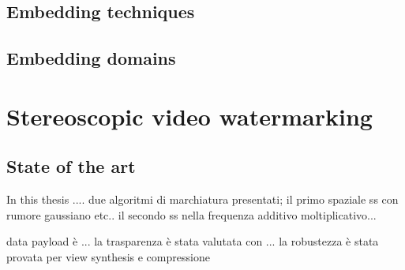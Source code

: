 \subsection{Embedding techniques}




\subsection{Embedding domains}


\section{Stereoscopic video watermarking}

\subsection{State of the art}



\newpage
In this thesis ....
due algoritmi di marchiatura presentati; il primo spaziale ss con rumore gaussiano etc.. 
il secondo ss nella frequenza additivo moltiplicativo...


data payload è ...
la trasparenza è stata valutata con ...
la robustezza è stata provata per view synthesis e compressione



